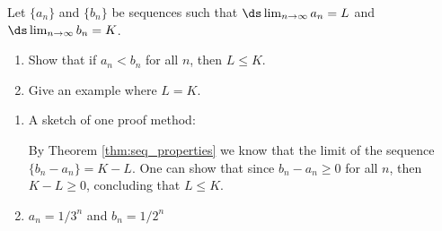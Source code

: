 {Let $\{a_n\}$ and $\{b_n\}$ be sequences such that $\ds\lim_{n\to\infty} a_n = L$ and $\ds\lim_{n\to\infty} b_n = K$. 
		\begin{enumerate}
		\item		Show that if $a_n<b_n$ for all $n$, then $L\leq K$. 
		\item		Give an example where $L = K$.
		\end{enumerate}
}
{\begin{enumerate}
\item		A sketch of one proof method: 

By Theorem \ref{thm:seq_properties} we know that the limit of the sequence $\{b_n-a_n\} = K-L$. One can show that since $b_n-a_n \geq 0$ for all $n$, then $K-L\geq 0$, concluding that $L\leq K$. 
\item		$a_n = 1/3^n$ and $b_n = 1/2^n$
\end{enumerate}
}
